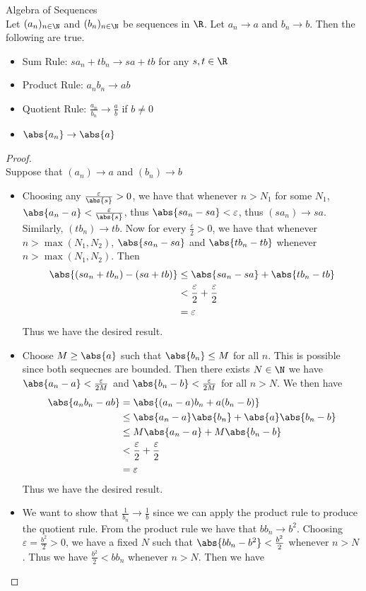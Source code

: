 \documentclass[a4paper]{article}
\begin{document}
\begin{prp}{Algebra of Sequences}{}\\ Let $(a_n)_{n\in\N}$ and $(b_n)_{n\in\N}$ be sequences in $\R$. Let $a_n\to a$ and $b_n\to b$. Then the following are true. 
\begin{itemize}
\item Sum Rule: $sa_n+tb_n\to sa+tb$ for any $s,t\in\R$
\item Product Rule: $a_nb_n\to ab$
\item Quotient Rule: $\frac{a_n}{b_n}\to\frac{a}{b}$ if $b\neq 0$
\item $\abs{a_n}\to\abs{a}$
\end{itemize}
\begin{proof}\\ Suppose that $(a_n)\to a$ and $(b_n)\to b$
\begin{itemize}
\item Choosing any $\frac{\varepsilon}{\abs{s}}>0$, we have that whenever $n>N_1$ for some $N_1$, $\abs{a_n-a}<\frac{\varepsilon}{\abs{s}}$, thus $\abs{sa_n-sa}<\varepsilon$, thus $(sa_n)\to sa$. Similarly, $(tb_n)\to tb$. Now for every $\frac{\varepsilon}{2}>0$, we have that whenever $n>\max{(N_1,N_2)}$, $\abs{sa_n-sa}$ and $\abs{tb_n-tb}$ whenever $n>\max{(N_1,N_2)}$. Then 
\begin{align*}
\abs{(sa_n+tb_n)-(sa+tb)}&\leq\abs{sa_n-sa}+\abs{tb_n-tb} \\
&<\frac{\varepsilon}{2}+\frac{\varepsilon}{2} \\
&=\varepsilon
\end{align*}
Thus we have the desired result. 
\item Choose $M\geq\abs{a}$ such that $\abs{b_n}\leq M$ for all $n$. This is possible since both sequecnes are bounded. Then there exists $N\in\N$ we have $\abs{a_n-a}<\frac{\varepsilon}{2M}$ and $\abs{b_n-b}<\frac{\varepsilon}{2M}$ for all $n>N$. We then have
\begin{align*}
\abs{a_nb_n-ab}&=\abs{(a_n-a)b_n+a(b_n-b)} \\
&\leq\abs{a_n-a}\abs{b_n}+\abs{a}\abs{b_n-b} \\
&\leq M\abs{a_n-a}+M\abs{b_n-b} \\
&<\frac{\varepsilon}{2}+\frac{\varepsilon}{2} \\
&=\varepsilon
\end{align*}
Thus we have the desired result. 
\item We want to show that $\frac{1}{b_n}\to\frac{1}{b}$ since we can apply the product rule to produce the quotient rule. From the product rule we have that $bb_n\to b^2$. Choosing $\varepsilon=\frac{b^2}{2}>0$, we have a fixed $N$ such that $\abs{bb_n-b^2}<\frac{b^2}{2}$ whenever $n>N$. Thus we have $\frac{b^2}{2}<bb_n$ whenever $n>N$. Then we have

\end{itemize}
\end{proof}
\end{prp}
\end{document}
